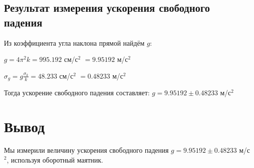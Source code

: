 \documentclass[a4paper]{article}
\begin{document}
\subsection{Результат измерения ускорения свободного падения}

Из коэффициента угла наклона прямой найдём $g$:

\item $g = 4\pi^2 k = 995.192$ см/с$^2$  $= 9.95192$ м/с$^2$
\item $\sigma_g = g \frac{\sigma_k}{k} = 48.233$ см/с$^2$ $= 0.48233$ м/с$^2$

\item Тогда ускорение свободного падения составляет: $g = 9.95192\pm{0.48233}$ м/с$^2$

\section{Вывод}

Мы измерили величину ускорения свободного падения $g = 9.95192\pm{0.48233}$ м/с$^2$, используя оборотный маятник.
\end{document}
